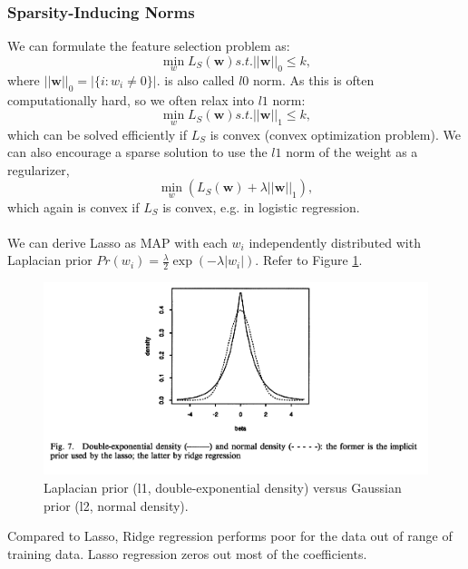 \documentclass{article}
\begin{document}
   \subsubsection{Sparsity-Inducing Norms}
   We can formulate the feature selection problem as:
   \begin{equation}
   \min_{w} L_S(\textbf{w}) s.t. ||\textbf{w}||_0 \leq k,
   \end{equation}
   where $||\textbf{w}||_0 = |\{ i:w_i \neq 0 \}|.$ is also called $l0$ norm. As this is often computationally hard, so we often relax into $l1$ norm:
   \begin{equation}
   \min_{w} L_S(\textbf{w}) s.t. ||\textbf{w}||_1 \leq k,
   \end{equation}
   which can be solved efficiently if $L_S$ is convex (convex optimization problem). We can also encourage a sparse solution to use the $l1$ norm of the weight as a regularizer,
   \begin{equation}
   \min_{w} (L_S(\textbf{w}) + \lambda ||\textbf{w}||_1),
   \end{equation}
   which again is convex if $L_S$ is convex, e.g. in logistic regression. 
   \\\\
   We can derive Lasso as MAP with each $w_i$ independently distributed with Laplacian prior $Pr(w_i) = \frac{\lambda}{2}\exp(-\lambda |w_i|)$. Refer to Figure \ref{fig:lasso_ridge}.
   \begin{figure}[h!]
   \centering
   \includegraphics[width=.8\columnwidth]{lasso_ridge}
   \caption{Laplacian prior (l1, double-exponential density) versus Gaussian prior (l2, normal density).}
   \label{fig:lasso_ridge}
   \end{figure}
   Compared to Lasso, Ridge regression performs poor for the data out of range of training data. Lasso regression zeros out most of the coefficients.
   
\end{document}
